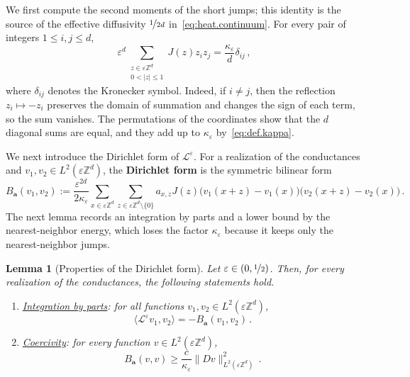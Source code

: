 \documentclass[11pt]{amsart}
\newtheorem{lemma}[theorem]{Lemma}
\numberwithin{equation}{section}
\newcommand{\Z}{\mathbb{Z}}
\newcommand{\ba}{\mathbf{a}}
\newcommand{\eps}{\varepsilon}
\newcommand{\Leps}{\mathcal{L}^\varepsilon}
\newcommand{\nf}{\nicefrac}
\begin{document}
We first compute the second moments of the short jumps; this identity is the source of the effective diffusivity $\nf{1}{2d}$ in~\eqref{eq:heat.continuum}.
For every pair of integers $1 \leq i, j \leq d$,
\begin{equation} \label{eq:second.moment}
    \eps^d \sum_{\substack{z \in \eps \Z^d \\ 0 < |z| \leq 1}} J(z) z_i z_j = \frac{\kappa_\eps}{d} \delta_{ij}\,,
\end{equation}
where $\delta_{ij}$ denotes the Kronecker symbol.
Indeed, if $i \neq j$, then the reflection $z_i \mapsto -z_i$ preserves the domain of summation and changes the sign of each term, so the sum vanishes.
The permutations of the coordinates show that the $d$ diagonal sums are equal, and they add up to $\kappa_\eps$ by~\eqref{eq:def.kappa}.

We next introduce the Dirichlet form of $\Leps$.
For a realization of the conductances and $v_1, v_2 \in L^2(\eps \Z^d)$, the \textbf{Dirichlet form} is the symmetric bilinear form
\begin{equation} \label{eq:def.B}
    B_\ba(v_1, v_2) := \frac{\eps^{2d}}{2 \kappa_\eps} \sum_{x \in \eps \Z^d} \sum_{z \in \eps \Z^d \setminus \{0\}} a_{x,z} J(z) \bigl( v_1(x + z) - v_1(x) \bigr) \bigl( v_2(x + z) - v_2(x) \bigr)\,.
\end{equation}
The next lemma records an integration by parts and a lower bound by the nearest-neighbor energy, which loses the factor $\kappa_\eps$ because it keeps only the nearest-neighbor jumps.

\begin{lemma}[Properties of the Dirichlet form] \label{lem:Dirichlet}
Let $\eps \in (0, \nf12)$.
Then, for every realization of the conductances, the following statements hold.
\begin{enumerate}
    \item[\textup{(i)}] \underline{\emph{Integration by parts}}: for all functions $v_1, v_2 \in L^2(\eps \Z^d)$,
    \begin{equation} \label{eq:IBP}
        \langle \Leps v_1, v_2 \rangle = - B_\ba(v_1, v_2)\,.
    \end{equation}
    \item[\textup{(ii)}] \underline{\emph{Coercivity}}: for every function $v \in L^2(\eps \Z^d)$,
    \begin{equation} \label{eq:coercivity}
        B_\ba(v, v) \geq \frac{c}{\kappa_\eps} \|D v\|_{L^2(\eps \Z^d)}^2\,.
    \end{equation}
\end{enumerate}
\end{lemma}
\end{document}
